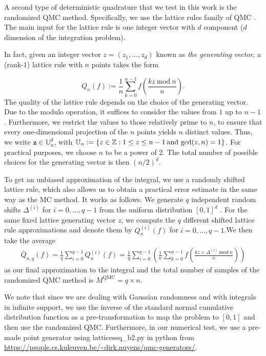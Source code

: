 A second type of deterministic quadrature that we test in this work is the randomized QMC method. Specifically, we use the lattice rules family of QMC \cite{sloan1985lattice,cools2008belgian,nuyens2014construction}.  The main input for the lattice rule is one integer vector with $d$ component ($d$ dimension of the integration problem).

In fact, given an integer vector $z = (z_1,\dots, z_d)$ known as \textit{the generating vector}, a (rank-$1$) lattice rule with $n$ points takes the form

\begin{equation}
Q_n(f):=\frac{1}{n}\sum_{k=0}^{n-1} f \left( \frac{kz \: \text{mod}\: n}{n}\right).
\end{equation}
The quality of the lattice rule depends on the choice of the generating vector. Due to the modulo operation, it suffices to consider the values from $1$ up to $n-1$. Furthermore, we restrict the values to those relatively prime to $n$, to ensure that every one-dimensional projection of the $n$ points yields $n$ distinct values. Thus, we write $\mathbf{z} \in \mathbb{U}_n^d$, with $\mathbb{U}_n:=\{z \in \mathbb{Z}: 1 \le z \le n-1\: \text{and gcd}(z,n)=1\}$. For practical purposes,  we choose $n$  to be a power of $2$. The total number of possible choices for the generating vector is then  $(n/2)^d$. 

To get an unbiased approximation of the integral, we use  a randomly shifted lattice rule, which also allows us to obtain a practical error estimate in the same way as the MC method. It works as follows. We generate $q$ independent random shifts $\Delta^{(i)}$ for $i=0,\dots,q-1$ from the uniform distribution  $[0,1]^d$ . For the same fixed lattice generating vector $z$, we compute the $q$ different shifted lattice rule approximations and denote
them by $Q^{(i )}_n(f)$ for $i=0,\dots,q-1$.We then take the average
\begin{align}
\overline{Q}_{n,q}(f)=\frac{1}{q} \sum_{i=0}^{q-1}Q^{(i )}_n(f)=\frac{1}{q}\sum_{i=0}^{q-1}\left(\frac{1}{n}\sum_{k=0}^{n-1} f \left( \frac{kz+\Delta^{(i)}  \: \text{mod}\: n}{n}\right)  \right)
\end{align}
as our final approximation to the integral and the total number of samples of the randomized QMC method is $M^{\text{QMC}}=q \times n$.

We note that since we are dealing with Gaussian randomness and with integrals in infinite support, we use the inverse of the standard normal cumulative distribution function as a pre-transformation to map the problem to $[0,1]$ and then use the randomized QMC. Furthermore, in our numerical test, we use a pre-made point generator using latticeseq\_b2.py in python from   \url{https://people.cs.kuleuven.be/~dirk.nuyens/qmc-generators/}.

